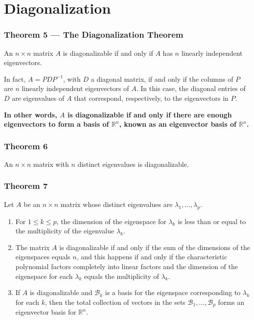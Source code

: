 \documentclass{article}
\begin{document}
\pagebreak

\section*{Diagonalization}
\subsubsection*{Theorem 5 --- The Diagonalization Theorem}
An $n\times n$ matrix $A$ is diagonalizable if and only if $A$ has $n$ linearly independent
eigenvectors.

In fact, $A=PDP^{-1}$, with $D$ a diagonal matrix, if and only if the columns of $P$ are $n$
linearly independent eigenvectors of $A$. In this case, the diagonal entries of $D$ are eigenvalues
of $A$ that correspond, respectively, to the eigenvectors in $P$.

\vspace{1em}
\textbf{In other words, $A$ is diagonalizable if and only if there are enough eigenvectors to form
a basis of $\mathbb{R}^n$, known as an eigenvector basis of $\mathbb{R}^n$.}

\subsubsection*{Theorem 6}
An $n\times n$ matrix with $n$ distinct eigenvalues is diagonalizable.

\subsubsection*{Theorem 7}
Let $A$ be an $n\times n$ matrix whose distinct eigenvalues are $\lambda_1, \ldots, \lambda_p$.
\begin{enumerate}
    \item For $1 \leq k \leq p$, the dimension of the eigenspace for $\lambda_k$ is less than or
    equal to the multiplicity of the eigenvalue $\lambda_k$.
    \item The matrix $A$ is diagonalizable if and only if the sum of the dimensions of the
    eigenspaces equals $n$, and this happens if and only if the characteristic polynomial factors
    completely into linear factors and the dimension of the eigenspace for each $\lambda_k$ equals
    the multiplicity of $\lambda_k$.
    \item If $A$ is diagonalizable and $\mathcal{B}_k$ is a basis for the eigenspace corresponding
    to $\lambda_k$ for each $k$, then the total collection of vectors in the sets
    $\mathcal{B}_1, \ldots, \mathcal{B}_p$ forms an eigenvector basis for $\mathbb{R}^n$.
\end{enumerate}
\end{document}
